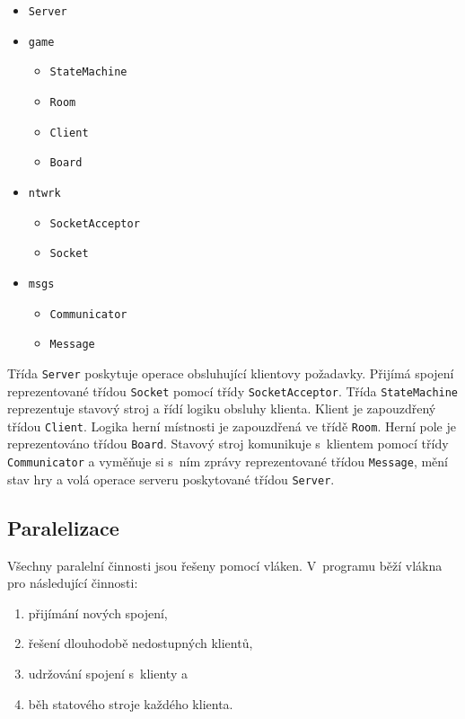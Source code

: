 \documentclass[a4paper, 12pt]{report}
\begin{document}
\begin{itemize}
    \item \texttt{Server}
    \item \texttt{game}
    \begin{itemize}
        \item \texttt{StateMachine}
        \item \texttt{Room}
        \item \texttt{Client}
        \item \texttt{Board}
    \end{itemize}
    \item \texttt{ntwrk}
    \begin{itemize}
        \item \texttt{SocketAcceptor}
        \item \texttt{Socket}
    \end{itemize}
    \item \texttt{msgs}
    \begin{itemize}
        \item \texttt{Communicator}
        \item \texttt{Message}
    \end{itemize}
\end{itemize}

Třída \texttt{Server} poskytuje operace obsluhující klientovy požadavky. Přijímá spojení reprezentované třídou \texttt{Socket} pomocí třídy \texttt{SocketAcceptor}. Třída \texttt{StateMachine} reprezentuje stavový stroj a řídí logiku obsluhy klienta. Klient je zapouzdřený třídou \texttt{Client}. Logika herní místnosti je zapouzdřená ve třídě \texttt{Room}. Herní pole je reprezentováno třídou \texttt{Board}. Stavový stroj komunikuje s~klientem pomocí třídy \texttt{Communicator} a vyměňuje si s~ním zprávy reprezentované třídou \texttt{Message}, mění stav hry a volá operace serveru poskytované třídou \texttt{Server}.

\subsection{Paralelizace}

Všechny paralelní činnosti jsou řešeny pomocí vláken. V~programu běží vlákna pro následující činnosti:

\begin{enumerate}
    \item přijímání nových spojení,
    \item řešení dlouhodobě nedostupných klientů,
    \item udržování spojení s~klienty a
    \item běh statového stroje každého klienta.
\end{enumerate}
\end{document}
